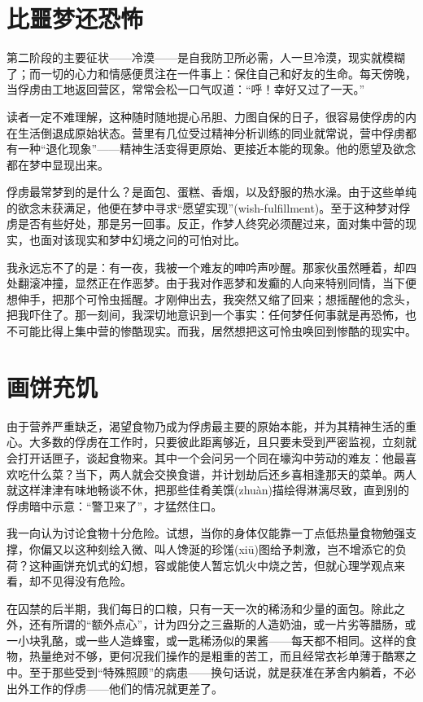 \documentclass[11pt,oneside]{book}
\begin{document}
\begin{common-format}
\section{比噩梦还恐怖}
第二阶段的主要征状——冷漠——是自我防卫所必需，人一旦冷漠，现实就模糊了；而一切的心力和情感便贯注在一件事上：保住自己和好友的生命。每天傍晚，当俘虏由工地返回营区，常常会松一口气叹道：“呼！幸好又过了一天。”

读者一定不难理解，这种随时随地提心吊胆、力图自保的日子，很容易使俘虏的内在生活倒退成原始状态。营里有几位受过精神分析训练的同业就常说，营中俘虏都有一种“退化现象”——精神生活变得更原始、更接近本能的现象。他的愿望及欲念都在梦中显现出来。

俘虏最常梦到的是什么？是面包、蛋糕、香烟，以及舒服的热水澡。由于这些单纯的欲念未获满足，他便在梦中寻求“愿望实现”(wish-fulfillment)。至于这种梦对俘虏是否有些好处，那是另一回事。反正，作梦人终究必须醒过来，面对集中营的现实，也面对该现实和梦中幻境之问的可怕对比。

我永远忘不了的是：有一夜，我被一个难友的呻吟声吵醒。那家伙虽然睡着，却四处翻滚冲撞，显然正在作恶梦。由于我对作恶梦和发癫的人向来特别同情，当下便想伸手，把那个可怜虫摇醒。才刚伸出去，我突然又缩了回来；想摇醒他的念头，把我吓住了。那一刻间，我深切地意识到一个事实：任何梦任何事就是再恐怖，也不可能比得上集中营的惨酷现实。而我，居然想把这可怜虫唤回到惨酷的现实中。


\section{画饼充饥}
由于营养严重缺乏，渴望食物乃成为俘虏最主要的原始本能，并为其精神生活的重心。大多数的俘虏在工作时，只要彼此距离够近，且只要未受到严密监视，立刻就会打开话匣子，谈起食物来。其中一个会问另一个同在壕沟中劳动的难友：他最喜欢吃什么菜？当下，两人就会交换食谱，并计划劫后还乡喜相逢那天的菜单。两人就这样津津有味地畅谈不休，把那些佳肴美馔(zhuàn)描绘得淋漓尽致，直到别的俘虏暗中示意：“警卫来了”，才猛然住口。

我一向认为讨论食物十分危险。试想，当你的身体仅能靠一丁点低热量食物勉强支撑，你偏又以这种刻绘入微、叫人馋涎的珍馐(xiū)图给予刺激，岂不增添它的负荷？这种画饼充饥式的幻想，容或能使人暂忘饥火中烧之苦，但就心理学观点来看，却不见得没有危险。

在囚禁的后半期，我们每日的口粮，只有一天一次的稀汤和少量的面包。除此之外，还有所谓的“额外点心”，计为四分之三盎斯的人造奶油，或一片劣等腊肠，或一小块乳酪，或一些人造蜂蜜，或一匙稀汤似的果酱——每天都不相同。这样的食物，热量绝对不够，更何况我们操作的是粗重的苦工，而且经常衣衫单薄于酷寒之中。至于那些受到“特殊照顾”的病患——换句话说，就是获准在茅舍内躺着，不必出外工作的俘虏——他们的情况就更差了。


\end{common-format}
\end{document}
